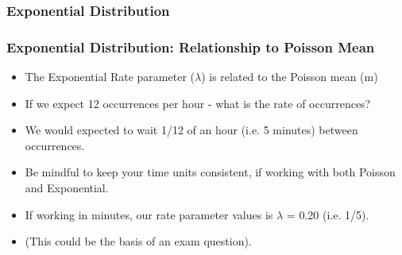 \documentclass[IntroMain.tex]{subfiles}
\begin{document}
\begin{frame}[fragile]
\frametitle{Exponential Distribution}

\end{frame}



\begin{frame}[fragile]
\frametitle{Exponential Distribution: Relationship to Poisson Mean}
\begin{itemize}
\item The Exponential Rate parameter ($\lambda$) is related to the Poisson mean (m)
\item If we expect 12 occurrences per hour - what is the rate of occurrences?
\item We would expected to wait 1/12 of an hour (i.e. 5 minutes) between occurrences.
\item Be mindful to keep your time units consistent, if working with both Poisson and Exponential.
\item If working in minutes, our rate parameter values is $\lambda$ = 0.20 (i.e. 1/5).
\item (This could be the basis of an exam question).
\end{itemize}
\end{frame}
\end{document}
